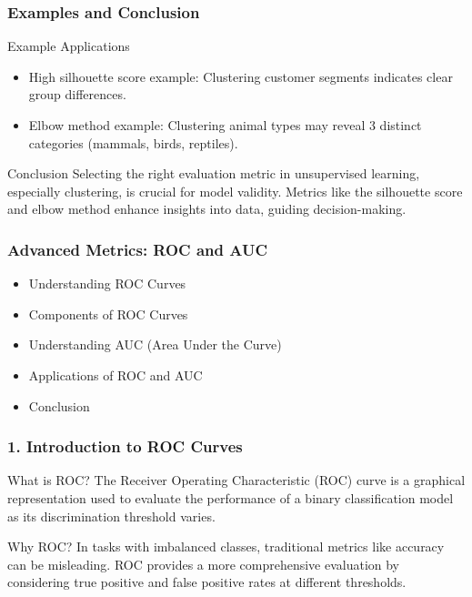 \documentclass[aspectratio=169]{beamer}
\begin{document}
\begin{frame}[fragile]
    \frametitle{Examples and Conclusion}

    \begin{block}{Example Applications}
        \begin{itemize}
            \item High silhouette score example: Clustering customer segments indicates clear group differences.
            \item Elbow method example: Clustering animal types may reveal 3 distinct categories (mammals, birds, reptiles).
        \end{itemize}
    \end{block}

    \begin{block}{Conclusion}
        Selecting the right evaluation metric in unsupervised learning, especially clustering, is crucial for model validity. Metrics like the silhouette score and elbow method enhance insights into data, guiding decision-making.
    \end{block}
\end{frame}

\begin{frame}[fragile]
    \frametitle{Advanced Metrics: ROC and AUC}
    \begin{itemize}
        \item Understanding ROC Curves
        \item Components of ROC Curves
        \item Understanding AUC (Area Under the Curve)
        \item Applications of ROC and AUC
        \item Conclusion
    \end{itemize}
\end{frame}

\begin{frame}[fragile]
    \frametitle{1. Introduction to ROC Curves}
    \begin{block}{What is ROC?}
        The Receiver Operating Characteristic (ROC) curve is a graphical representation used to evaluate the performance of a binary classification model as its discrimination threshold varies.
    \end{block}
    
    \begin{block}{Why ROC?}
        In tasks with imbalanced classes, traditional metrics like accuracy can be misleading. ROC provides a more comprehensive evaluation by considering true positive and false positive rates at different thresholds.
    \end{block}
\end{frame}
\end{document}
